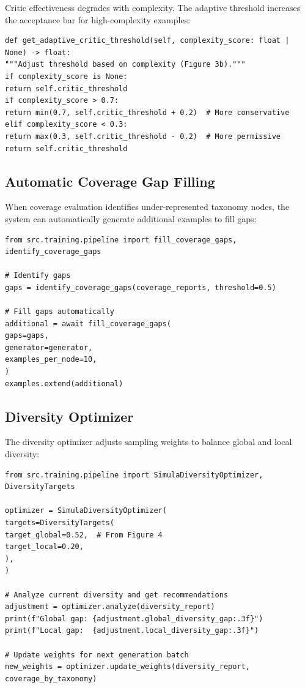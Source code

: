 \documentclass[12pt,a4paper,twoside]{report}
\begin{document}
Critic effectiveness degrades with complexity. The adaptive threshold increases
the acceptance bar for high-complexity examples:

\begin{lstlisting}[language=jsonx,caption={Adaptive critic threshold}]
def get_adaptive_critic_threshold(self, complexity_score: float | None) -> float:
"""Adjust threshold based on complexity (Figure 3b)."""
if complexity_score is None:
return self.critic_threshold
if complexity_score > 0.7:
return min(0.7, self.critic_threshold + 0.2)  # More conservative
elif complexity_score < 0.3:
return max(0.3, self.critic_threshold - 0.2)  # More permissive
return self.critic_threshold
\end{lstlisting}

\subsection{Automatic Coverage Gap Filling}

When coverage evaluation identifies under-represented taxonomy nodes, the system
can automatically generate additional examples to fill gaps:

\begin{lstlisting}[language=jsonx,caption={Coverage gap filling}]
from src.training.pipeline import fill_coverage_gaps, identify_coverage_gaps

# Identify gaps
gaps = identify_coverage_gaps(coverage_reports, threshold=0.5)

# Fill gaps automatically
additional = await fill_coverage_gaps(
gaps=gaps,
generator=generator,
examples_per_node=10,
)
examples.extend(additional)
\end{lstlisting}

\subsection{Diversity Optimizer}

The diversity optimizer adjusts sampling weights to balance global and local diversity:

\begin{lstlisting}[language=jsonx,caption={Diversity optimizer usage}]
from src.training.pipeline import SimulaDiversityOptimizer, DiversityTargets

optimizer = SimulaDiversityOptimizer(
targets=DiversityTargets(
target_global=0.52,  # From Figure 4
target_local=0.20,
),
)

# Analyze current diversity and get recommendations
adjustment = optimizer.analyze(diversity_report)
print(f"Global gap: {adjustment.global_diversity_gap:.3f}")
print(f"Local gap:  {adjustment.local_diversity_gap:.3f}")

# Update weights for next generation batch
new_weights = optimizer.update_weights(diversity_report, coverage_by_taxonomy)
\end{lstlisting}
\end{document}

